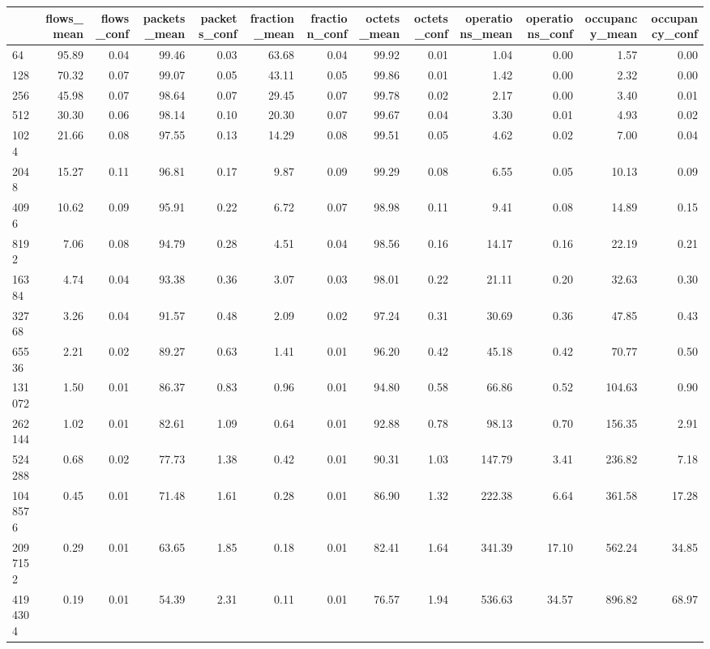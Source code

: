 \begin{tabular}{lrrrrrrrrrrrr}
\toprule
 & flows_mean & flows_conf & packets_mean & packets_conf & fraction_mean & fraction_conf & octets_mean & octets_conf & operations_mean & operations_conf & occupancy_mean & occupancy_conf \\
\midrule
64 & 95.89 & 0.04 & 99.46 & 0.03 & 63.68 & 0.04 & 99.92 & 0.01 & 1.04 & 0.00 & 1.57 & 0.00 \\
128 & 70.32 & 0.07 & 99.07 & 0.05 & 43.11 & 0.05 & 99.86 & 0.01 & 1.42 & 0.00 & 2.32 & 0.00 \\
256 & 45.98 & 0.07 & 98.64 & 0.07 & 29.45 & 0.07 & 99.78 & 0.02 & 2.17 & 0.00 & 3.40 & 0.01 \\
512 & 30.30 & 0.06 & 98.14 & 0.10 & 20.30 & 0.07 & 99.67 & 0.04 & 3.30 & 0.01 & 4.93 & 0.02 \\
1024 & 21.66 & 0.08 & 97.55 & 0.13 & 14.29 & 0.08 & 99.51 & 0.05 & 4.62 & 0.02 & 7.00 & 0.04 \\
2048 & 15.27 & 0.11 & 96.81 & 0.17 & 9.87 & 0.09 & 99.29 & 0.08 & 6.55 & 0.05 & 10.13 & 0.09 \\
4096 & 10.62 & 0.09 & 95.91 & 0.22 & 6.72 & 0.07 & 98.98 & 0.11 & 9.41 & 0.08 & 14.89 & 0.15 \\
8192 & 7.06 & 0.08 & 94.79 & 0.28 & 4.51 & 0.04 & 98.56 & 0.16 & 14.17 & 0.16 & 22.19 & 0.21 \\
16384 & 4.74 & 0.04 & 93.38 & 0.36 & 3.07 & 0.03 & 98.01 & 0.22 & 21.11 & 0.20 & 32.63 & 0.30 \\
32768 & 3.26 & 0.04 & 91.57 & 0.48 & 2.09 & 0.02 & 97.24 & 0.31 & 30.69 & 0.36 & 47.85 & 0.43 \\
65536 & 2.21 & 0.02 & 89.27 & 0.63 & 1.41 & 0.01 & 96.20 & 0.42 & 45.18 & 0.42 & 70.77 & 0.50 \\
131072 & 1.50 & 0.01 & 86.37 & 0.83 & 0.96 & 0.01 & 94.80 & 0.58 & 66.86 & 0.52 & 104.63 & 0.90 \\
262144 & 1.02 & 0.01 & 82.61 & 1.09 & 0.64 & 0.01 & 92.88 & 0.78 & 98.13 & 0.70 & 156.35 & 2.91 \\
524288 & 0.68 & 0.02 & 77.73 & 1.38 & 0.42 & 0.01 & 90.31 & 1.03 & 147.79 & 3.41 & 236.82 & 7.18 \\
1048576 & 0.45 & 0.01 & 71.48 & 1.61 & 0.28 & 0.01 & 86.90 & 1.32 & 222.38 & 6.64 & 361.58 & 17.28 \\
2097152 & 0.29 & 0.01 & 63.65 & 1.85 & 0.18 & 0.01 & 82.41 & 1.64 & 341.39 & 17.10 & 562.24 & 34.85 \\
4194304 & 0.19 & 0.01 & 54.39 & 2.31 & 0.11 & 0.01 & 76.57 & 1.94 & 536.63 & 34.57 & 896.82 & 68.97 \\

\end{tabular}
